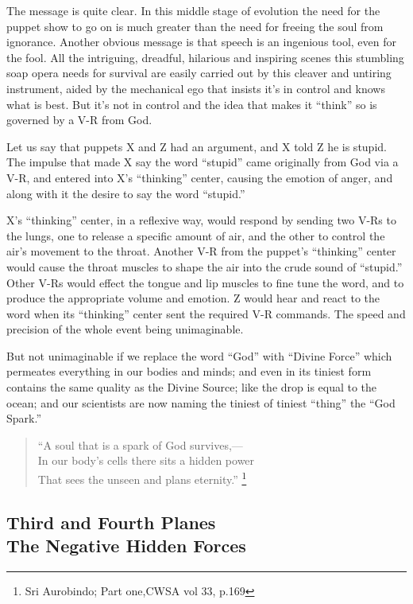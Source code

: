 \documentclass[12pt,a4paper]{book}
\begin{document}
The message is quite clear. In this middle stage of evolution the need
for the puppet show to go on is much greater than the need for freeing
the soul from ignorance. Another obvious message is that speech is an
ingenious tool, even for the fool. All the intriguing, dreadful,
hilarious and inspiring scenes this stumbling soap opera needs for
survival are easily carried out by this cleaver and untiring
instrument, aided by the mechanical ego that insists it's in control
and knows what is best. But it's not in control and the idea that
makes it ``think'' so is governed by a V-R from God.

Let us say that puppets X and Z had an argument, and X told Z he is
stupid. The impulse that made X say the word ``stupid'' came
originally from God via a V-R, and entered into X's ``thinking''
center, causing the emotion of anger, and along with it the desire to
say the word ``stupid.''

X's ``thinking'' center, in a reflexive way, would respond by sending
two V-Rs to the lungs, one to release a specific amount of air, and
the other to control the air's movement to the throat. Another V-R
from the puppet's ``thinking'' center would cause the throat muscles
to shape the air into the crude sound of ``stupid.''  Other V-Rs would
effect the tongue and lip muscles to fine tune the word, and to
produce the appropriate volume and emotion. Z would hear and react to
the word when its ``thinking'' center sent the required V-R
commands. The speed and precision of the whole event being
unimaginable.

But not unimaginable if we replace the word ``God'' with ``Divine
Force'' which permeates everything in our bodies and minds; and even
in its tiniest form contains the same quality as the Divine Source;
like the drop is equal to the ocean; and our scientists are now naming
the tiniest of tiniest ``thing'' the ``God Spark.''

\begin{verse}
``A soul that is a spark of God survives,---\\
In our body's cells there sits a hidden power\\
That sees the unseen and plans eternity.'' \footnote {Sri Aurobindo; Part one,CWSA vol 33, p.169}
\end{verse}

\newpage
\begin{center}\section*{Third and Fourth Planes\\The Negative Hidden Forces}\end{center}
\end{document}
